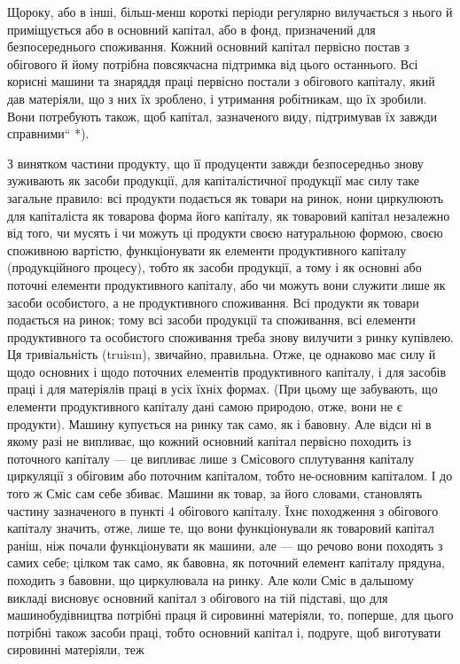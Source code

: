 Щороку, або в інші, більш-менш короткі періоди регулярно вилучається
з нього й приміщується або в основний капітал, або в фонд, призначений
для безпосереднього споживання. Кожний основний капітал первісно
постав з обігового й йому потрібна повсякчасна підтримка від цього
останнього. Всі корисні машини та знаряддя праці первісно постали з
обігового капіталу, який дав матеріяли, що з них їх зроблено, і утримання
робітникам, що їх зробили. Вони потребують також, щоб капітал,
зазначеного виду, підтримував їх завжди справними“ *).

З винятком частини продукту, що її продуценти завжди безпосередньо
знову зуживають як засоби продукції, для капіталістичної продукції
має силу таке загальне правило: всі продукти подається як товари на ринок,
нони циркулюють для капіталіста як товарова форма його капіталу, як товаровий
капітал незалежно від того, чи мусять і чи можуть ці продукти
своєю натуральною формою, своєю споживною вартістю, функціонувати як
елементи продуктивного капіталу (продукційного процесу), тобто як засоби
продукції, а тому і як основні або поточні елементи продуктивного капіталу,
або чи можуть вони служити лише як засоби особистого, а не продуктивного
споживання. Всі продукти як товари подається на ринок;
тому всі засоби продукції та споживання, всі елементи продуктивного та
особистого споживання треба знову вилучити з ринку купівлею. Ця тривіальність
(truism), звичайно, правильна. Отже, це однаково має силу й
щодо основних і щодо поточних елементів продуктивного капіталу, і
для засобів праці і для матеріялів праці в усіх їхніх формах. (При цьому
ще забувають, що елементи продуктивного капіталу дані самою природою,
отже, вони не є продукти). Машину купується на ринку так само,
як і бавовну. Але відси ні в якому разі не випливає, що кожний основний
капітал первісно походить із поточного капіталу — це випливає лише
з Смісового сплутування капіталу циркуляції з обіговим або поточним
капіталом, тобто не-основним капіталом. І до того ж Сміс сам себе збиває.
Машини як товар, за його словами, становлять частину зазначеного
в пункті 4 обігового капіталу. Їхнє походження з обігового капіталу значить,
отже, лише те, що вони функціонували як товаровий капітал раніш,
ніж почали функціонувати як машини, але — що речово вони походять
з самих себе; цілком так само, як бавовна, як поточний елемент капіталу
прядуна, походить з бавовни, що циркулювала на ринку. Але коли
Сміс в дальшому викладі висновує основний капітал з обігового на
тій підставі, що для машинобудівництва потрібні праця й сировинні матеріяли,
то, поперше, для цього потрібні також засоби праці, тобто основний
капітал і, подруге, щоб виготувати сировинні матеріяли, теж

